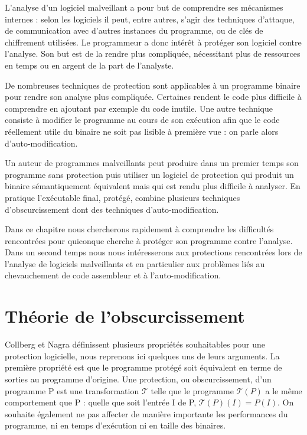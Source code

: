 L'analyse d'un logiciel malveillant a pour but de comprendre ses mécanismes internes : selon les logiciels il peut, entre autres, s'agir des techniques d'attaque, de communication avec d'autres instances du programme, ou de clés de chiffrement utilisées. Le programmeur a donc intérêt à protéger son logiciel contre l'analyse. Son but est de la rendre plus compliquée, nécessitant plus de ressources en temps ou en argent de la part de l'analyste.

De nombreuses techniques de protection sont applicables à un programme binaire pour rendre son analyse plus compliquée. Certaines rendent le code plus difficile à comprendre en ajoutant par exemple du code inutile. Une autre technique consiste à modifier le programme au cours de son exécution afin que le code réellement utile du binaire ne soit pas lisible à première vue : on parle alors d'auto-modification.

Un auteur de programmes malveillants peut produire dans un premier temps son programme sans protection puis utiliser un logiciel de protection qui produit un binaire sémantiquement équivalent mais qui est rendu plus difficile à analyser. En pratique l'exécutable final, protégé, combine plusieurs techniques d'obscurcissement dont des techniques d'auto-modification.

Dans ce chapitre nous chercherons rapidement à comprendre les difficultés rencontrées pour quiconque cherche à protéger son programme contre l'analyse. Dans un second temps nous nous intéresserons aux protections rencontrées lors de l'analyse de logiciels malveillants et en particulier aux problèmes liés au chevauchement de code assembleur et à l'auto-modification.



\section{Théorie de l'obscurcissement}
Collberg et Nagra \cite{nagra2009surreptitious} définissent plusieurs propriétés souhaitables pour une protection logicielle, nous reprenons ici quelques uns de leurs arguments. La première propriété est que le programme protégé soit équivalent en terme de sorties au programme d'origine.
Une protection, ou obscurcissement, d'un programme P est une transformation $\mathcal{T}$ telle que le programme $\mathcal{T}(P)$ a le même comportement que P : quelle que soit l'entrée I de P, $\mathcal{T}(P)(I)=P(I)$.
On souhaite également ne pas affecter de manière importante les performances du programme, ni en temps d'exécution ni en taille des binaires.

